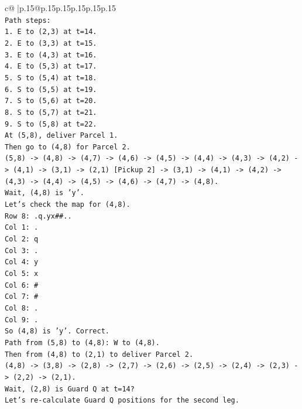 \documentclass{article}
\begin{document}
{\begin{supertabular}{c@{$\;$}|p{.15\linewidth}@{}p{.15\linewidth}p{.15\linewidth}p{.15\linewidth}p{.15\linewidth}p{.15\linewidth}}
{{{\\ 
\texttt{Path steps:} \\
\texttt{1. E to (2,3) at t=14.} \\
\texttt{2. E to (3,3) at t=15.} \\
\texttt{3. E to (4,3) at t=16.} \\
\texttt{4. E to (5,3) at t=17.} \\
\texttt{5. S to (5,4) at t=18.} \\
\texttt{6. S to (5,5) at t=19.} \\
\texttt{7. S to (5,6) at t=20.} \\
\texttt{8. S to (5,7) at t=21.} \\
\texttt{9. S to (5,8) at t=22.} \\
\texttt{At (5,8), deliver Parcel 1.} \\
\texttt{Then go to (4,8) for Parcel 2.} \\
\texttt{(5,8) {-}> (4,8) {-}> (4,7) {-}> (4,6) {-}> (4,5) {-}> (4,4) {-}> (4,3) {-}> (4,2) {-}> (4,1) {-}> (3,1) {-}> (2,1) {[}Pickup 2{]} {-}> (3,1) {-}> (4,1) {-}> (4,2) {-}> (4,3) {-}> (4,4) {-}> (4,5) {-}> (4,6) {-}> (4,7) {-}> (4,8).} \\
\texttt{Wait, (4,8) is 'y'.} \\
\texttt{Let's check the map for (4,8).} \\
\texttt{Row 8: .q.yx\#\#..} \\
\texttt{Col 1: .} \\
\texttt{Col 2: q} \\
\texttt{Col 3: .} \\
\texttt{Col 4: y} \\
\texttt{Col 5: x} \\
\texttt{Col 6: \#} \\
\texttt{Col 7: \#} \\
\texttt{Col 8: .} \\
\texttt{Col 9: .} \\
\texttt{So (4,8) is 'y'. Correct.} \\
\texttt{Path from (5,8) to (4,8): W to (4,8).} \\
\texttt{Then from (4,8) to (2,1) to deliver Parcel 2.} \\
\texttt{(4,8) {-}> (3,8) {-}> (2,8) {-}> (2,7) {-}> (2,6) {-}> (2,5) {-}> (2,4) {-}> (2,3) {-}> (2,2) {-}> (2,1).} \\
\texttt{Wait, (2,8) is Guard Q at t=14?} \\
\texttt{Let's re{-}calculate Guard Q positions for the second leg.} \\
}}}
\end{supertabular}}
\end{document}
